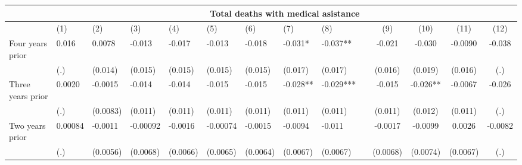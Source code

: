 \begin{tabular}{lccccrrrrrcccc}
\toprule
      & \multicolumn{13}{c}{Total deaths with medical asistance} \\
\midrule
      & \multicolumn{1}{l}{(1)} & \multicolumn{1}{l}{(2)} & \multicolumn{1}{l}{(3)} & \multicolumn{1}{l}{(4)} & \multicolumn{1}{l}{(5)} & \multicolumn{1}{l}{(6)} & \multicolumn{1}{l}{(7)} & \multicolumn{1}{l}{(8)} &       & (9)   & (10)  & (11)  & (12) \\
\midrule
\midrule
Four years prior & \multicolumn{1}{l}{0.016} & \multicolumn{1}{l}{0.0078} & \multicolumn{1}{l}{-0.013} & \multicolumn{1}{l}{-0.017} & \multicolumn{1}{l}{-0.013} & \multicolumn{1}{l}{-0.018} & \multicolumn{1}{l}{-0.031*} & \multicolumn{1}{l}{-0.037**} &       & -0.021 & -0.030 & -0.0090 & -0.038 \\
      & \multicolumn{1}{l}{(.)} & \multicolumn{1}{l}{(0.014)} & \multicolumn{1}{l}{(0.015)} & \multicolumn{1}{l}{(0.015)} & \multicolumn{1}{l}{(0.015)} & \multicolumn{1}{l}{(0.015)} & \multicolumn{1}{l}{(0.017)} & \multicolumn{1}{l}{(0.017)} &       & (0.016) & (0.019) & (0.016) & (.) \\
Three years prior & \multicolumn{1}{l}{0.0020} & \multicolumn{1}{l}{-0.0015} & \multicolumn{1}{l}{-0.014} & \multicolumn{1}{l}{-0.014} & \multicolumn{1}{l}{-0.015} & \multicolumn{1}{l}{-0.015} & \multicolumn{1}{l}{-0.028**} & \multicolumn{1}{l}{-0.029***} &       & -0.015 & -0.026** & -0.0067 & -0.026 \\
      & \multicolumn{1}{l}{(.)} & \multicolumn{1}{l}{(0.0083)} & \multicolumn{1}{l}{(0.011)} & \multicolumn{1}{l}{(0.011)} & \multicolumn{1}{l}{(0.011)} & \multicolumn{1}{l}{(0.011)} & \multicolumn{1}{l}{(0.011)} & \multicolumn{1}{l}{(0.011)} &       & (0.011) & (0.012) & (0.011) & (.) \\
Two years prior & \multicolumn{1}{l}{0.00084} & \multicolumn{1}{l}{-0.0011} & \multicolumn{1}{l}{-0.00092} & \multicolumn{1}{l}{-0.0016} & \multicolumn{1}{l}{-0.00074} & \multicolumn{1}{l}{-0.0015} & \multicolumn{1}{l}{-0.0094} & \multicolumn{1}{l}{-0.011} &       & -0.0017 & -0.0099 & 0.0026 & -0.0082 \\
      & \multicolumn{1}{l}{(.)} & \multicolumn{1}{l}{(0.0056)} & \multicolumn{1}{l}{(0.0068)} & \multicolumn{1}{l}{(0.0066)} & \multicolumn{1}{l}{(0.0065)} & \multicolumn{1}{l}{(0.0064)} & \multicolumn{1}{l}{(0.0067)} & \multicolumn{1}{l}{(0.0067)} &       & (0.0068) & (0.0074) & (0.0067) & (.) \\

\end{tabular}
